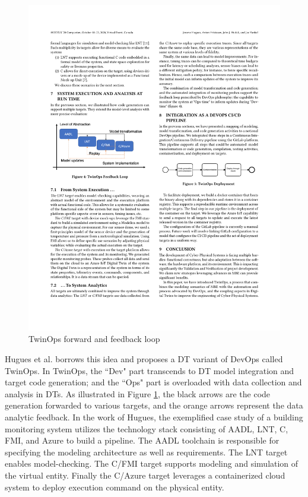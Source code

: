 \begin{figure}[hbt!]
  \centering
  \includegraphics[scale=0.9]{figures/twinopsloop.pdf}
  \caption[TwinOps forward and feedback loop]{TwinOps forward and feedback loop \cite{Hugues2020}}
  \label{fig:twinopsloop}
\end{figure}

Hugues et al. \cite{Hugues2020} borrows this idea and proposes a DT variant of DevOps called TwinOps. In TwinOps, the ``Dev" part transcends to DT model integration and target code generation; and the ``Ops" part is overloaded with data collection and analysis in DTs. As illustrated in Figure \ref{fig:twinopsloop}, the black arrows are the code generation forwarded to various targets, and the orange arrows represent the data analytic feedback. In the work of Hugues, the exemplified case study of a building monitoring system utilizes the technology stack consisting of AADL, LNT, C, FMI, and Azure to build a pipeline. The AADL toolchain is responsible for specifying the modeling architecture as well as requirements. The LNT target enables model-checking. The C/FMI target supports modeling and simulation of the virtual entity. Finally the C/Azure target leverages a containerized cloud system to deploy execution command on the physical entity.

